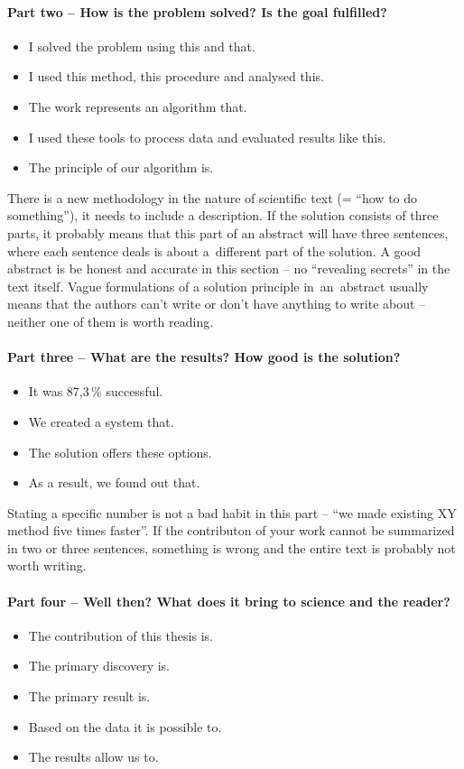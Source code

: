 \paragraph{Part two -- How is the problem solved? Is the goal fulfilled?}
\begin{itemize}
  \item{I solved the problem using this and that.}
  \item{I used this method, this procedure and analysed this.}
  \item{The work represents an algorithm that.}
  \item{I used these tools to process data and evaluated results like this.}
  \item{The principle of our algorithm is.}
\end{itemize}

There is a new methodology in the nature of scientific text (= ``how to do something''), it needs to include a description. If the solution consists of three parts, it probably means that this part of an abstract will have three sentences, where each sentence deals is about a~different part of the solution. A good abstract is be honest and accurate in this section -- no ``revealing secrets'' in the text itself. Vague formulations of a solution principle in~an~abstract usually means that the authors can't write or don't have anything to write about -- neither one of them is worth reading.

\paragraph{Part three -- What are the results? How good is the solution?}
\begin{itemize}
  \item{It was 87,3\,\% successful.}
  \item{We created a system that.}
  \item{The solution offers these options.}
  \item{As a result, we found out that.}
\end{itemize}

Stating a specific number is not a bad habit in this part -- ``we made existing XY method five times faster''. If the contributon of your work cannot be summarized in two or three sentences, something is wrong and the entire text is probably not worth writing.

\paragraph{Part four -- Well then? What does it bring to science and the reader?}
\begin{itemize}
  \item{The contribution of this thesis is.}
  \item{The primary discovery is.}
  \item{The primary result is.}
  \item{Based on the data it is possible to.}
  \item{The results allow us to.}
\end{itemize}

